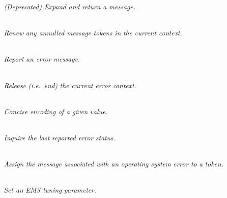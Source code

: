 \documentclass[twoside,11pt]{article}
\newcommand{\htmlref}[2]{#1}
\renewcommand{\_}{\texttt{\symbol{95}}}
\newcommand{\listline}{\hspace{1pt}\\}
\newcommand{\listline}{}
\begin{document}
\begin {description}
\textit{(Deprecated) Expand and return a message. }
\item [\htmlref{EMS\_RENEW}{EMS_RENEW}] \listline
\textit{Renew any annulled message tokens in the current context.}
\item [\htmlref{EMS\_REP}{EMS_REP} ( PARAM, TEXT, STATUS )] \listline 
\textit{Report an error message.}
\item [\htmlref{EMS\_RLSE}{EMS_RLSE}] \listline
\textit{Release (i.e.\ end) the current error context.}
\item [\htmlref{EMS\_SETx}{EMS_SETx}  ( TOKEN, VALUE )] \listline 
\textit{Concise encoding of a given value. }
\item [\htmlref{EMS\_STAT}{EMS_STAT}  ( STATUS )] \listline
\textit{Inquire the last reported error status.}
\item [\htmlref{EMS\_SYSER}{EMS_SYSER}  ( TOKEN, SYSTAT )] \listline 
\textit{Assign the message associated with an operating system error
to a token.}
\item [\htmlref{EMS\_TUNE}{EMS_TUNE} ( KEY, VALUE, STATUS )] \listline 
\textit{Set an EMS tuning parameter.}
\end {description}

\newpage
\end{document}
